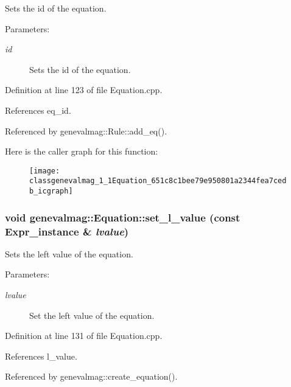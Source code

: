 Sets the id of the equation. \begin{Desc}
\item[Parameters:]
\begin{description}
\item[{\em id}]Sets the id of the equation. \end{description}
\end{Desc}


Definition at line 123 of file Equation.cpp.

References eq\_\-id.

Referenced by genevalmag::Rule::add\_\-eq().

Here is the caller graph for this function:\nopagebreak
\begin{figure}[H]
\begin{center}
\leavevmode
\texttt{[image: classgenevalmag\_1\_1Equation\_651c8c1bee79e950801a2344fea7cedb\_icgraph]}
\end{center}
\end{figure}
\hypertarget{classgenevalmag_1_1Equation_640c6b66f92e52b3554e75f9f9d18243}{
\subsubsection[{set\_\-l\_\-value}]{\setlength{\rightskip}{0pt plus 5cm}void genevalmag::Equation::set\_\-l\_\-value (const {\bf Expr\_\-instance} \& {\em lvalue})}}
\label{classgenevalmag_1_1Equation_640c6b66f92e52b3554e75f9f9d18243}


Sets the left value of the equation. \begin{Desc}
\item[Parameters:]
\begin{description}
\item[{\em lvalue}]Set the left value of the equation. \end{description}
\end{Desc}


Definition at line 131 of file Equation.cpp.

References l\_\-value.

Referenced by genevalmag::create\_\-equation().

